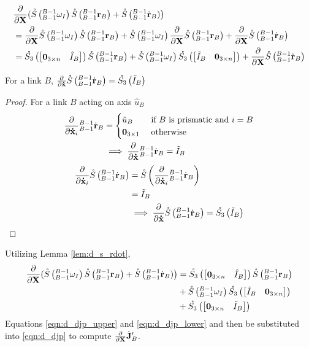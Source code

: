 \begin{align*}
    &\partialX{}(\S{^{B-1}_{B-1}\omega_I}\S{^{B-1}_{B-1}\r_B}+\S{^{B-1}_{B-1}\dotr_B)} \\& = \partialX{}\S{^{B-1}_{B-1}\omega_I}\S{^{B-1}_{B-1}\r_B} + \S{^{B-1}_{B-1}\omega_I}\partialX{}\S{^{B-1}_{B-1}\r_B} + \partialX{}\S{^{B-1}_{B-1}\dotr_B} \\
    &= \Sn{\begin{bmatrix}
\ZERO_{3 \times n} & \IHat_B
\end{bmatrix}}\S{^{B-1}_{B-1}\r_B} + \S{^{B-1}_{B-1}\omega_I}\Sn{\begin{bmatrix}
\ITilde_B & \ZERO_{3 \times n}
\end{bmatrix}} + \partialX{}\S{^{B-1}_{B-1}\dotr_B}
\end{align*}

\begin{lemma} \label{lem:d_s_rdot}
For a link $B$, $\frac{\partial}{\partial \dotx}\S{^{B-1}_{B-1}\dotr_{B}} = \Sn{\ITilde_B}$
\begin{proof}
\noindent For a link $B$ acting on axis $\hat{u}_B$
\begin{align*}
    \frac{\partial}{\partial \dotx_i}{^{B-1}_{B-1}\dotr_{B}} &= \begin{cases}
    \hat{u}_B & \text{ if $B$ is prismatic and  } i = B \\
    \ZERO_{3 \times 1} & \text{ otherwise }
    \end{cases} \\ 
    &\implies \partialxdot{}{^{B-1}_{B-1}\dotr_{B}} = \ITilde_B
\end{align*}
\begin{align*}
    \frac{\partial}{\partial \dotx_i}\S{^{B-1}_{B-1}\dotr_{B}} &= \S{\frac{\partial}{\partial \dotx_i}{^{B-1}_{B-1}\dotr_{B}}}\\
    &= \ITilde_B \\
    &\implies \partialxdot{}{\S{^{B-1}_{B-1}\dotr_{B}}} = \Sn{\ITilde_B}
\end{align*}
\end{proof}
\end{lemma}
\noindent Utilizing Lemma \ref{lem:d_s_rdot}, 
\begin{align} \label{eqn:d_djp_lower}
    \partialX{}(\S{^{B-1}_{B-1}\omega_I}\S{^{B-1}_{B-1}\r_B}+\S{^{B-1}_{B-1}\dotr_B)} &= \Sn{\begin{bmatrix}
\ZERO_{3 \times n} & \IHat_B
\end{bmatrix}}\S{^{B-1}_{B-1}\r_B} \\ &+ \S{^{B-1}_{B-1}\omega_I}\Sn{\begin{bmatrix}
\ITilde_B & \ZERO_{3 \times n}
\end{bmatrix}}\nonumber \\ &+ \Sn{\begin{bmatrix}
\ZERO_{3 \times n} & \ITilde_B
\end{bmatrix}} \nonumber
\end{align}
Equations \ref{eqn:d_djp_upper} and \ref{eqn:d_djp_lower} and then be substituted into \ref{eqn:d_djp} to compute $\partialX{}\dotJ_B'$.

